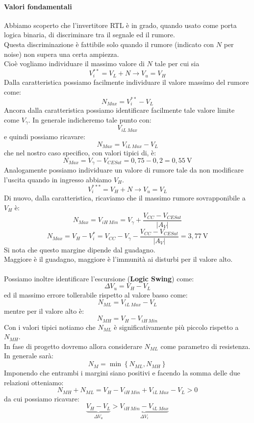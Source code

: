\documentclass[../main.tex]{subfiles}
\begin{document}
	\paragraph{Valori fondamentali}
	Abbiamo scoperto che l’invertitore RTL è in grado, quando usato come porta logica binaria, di discriminare tra il segnale ed il rumore. \\
	Questa discriminazione è fattibile solo quando il rumore (indicato con $N$ per noise) non supera una certa ampiezza. \\
	Cioè vogliamo individuare il massimo valore di $N$ tale per cui sia
	$$V_i^{**} = V_L + N \longrightarrow V_u = V_H$$
	Dalla caratteristica possiamo facilmente individuare il valore massimo del rumore come:
	$$N_{Max} = V_i^{**} - V_L$$
	Ancora dalla caratteristica possiamo identificare facilmente tale valore limite come $V_\gamma$. In generale indicheremo tale punto con:
	$$V_{iL \ Max}$$
	e quindi possiamo ricavare:
	$$N_{Max} = V_{iL \ Max} - V_L$$
	che nel nostro caso specifico, con valori tipici di, è:
	$$N_{Max} = V_\gamma - V_{CESat} = 0,75 - 0,2 = 0,55\ \text{V}$$
	Analogamente possiamo individuare un valore di rumore tale da non modificare l’uscita quando in ingresso abbiamo $V_H$.
	$$V_i^{***} = V_H + N \longrightarrow V_u = V_L$$
	Di nuovo, dalla caratteristica, ricaviamo che il massimo rumore sovrapponibile a $V_H$ è:
	$$N_{Max} = V_{iH \ Min} = V_\gamma + \frac{V_{CC} - V_{CESat}}{|A_V|}$$
	$$N_{Max} = V_H - V_i^* = V_{CC} - V_\gamma - \frac{V_{CC} - V_{CESat}}{|A_V|} = 3,77\ \text{V}$$
	Si nota che questo margine dipende dal guadagno. \\
	Maggiore è il guadagno, maggiore è l’immunità ai disturbi per il valore alto.\\\\
	Possiamo inoltre identificare l’escursione (\textbf{Logic Swing}) come:
	$$\Delta V_u = V_H - V_L$$
	ed il massimo errore tollerabile rispetto al valore basso come:
	$$N_{ML} = V_{iL \ Max} - V_L$$
	mentre per il valore alto è:
	$$N_{MH} = V_H - V_{iH \ Min}$$
	Con i valori tipici notiamo che $N_{ML}$ è significativamente più piccolo rispetto a $N_{MH}$. \\
	In fase di progetto dovremo allora considerare $N_{ML}$ come parametro di resistenza. In generale sarà:
	$$N_M = \min \left\{N_{ML}, N_{MH}\right\}$$
	Imponendo che entrambi i margini siano positivi e facendo la somma delle due relazioni otteniamo:
	$$N_{MH} + N_{ML} = V_H - V_{iH \ Min} + V_{iL \ Max} - V_L > 0$$
	da cui possiamo ricavare:
	$$\underbrace{V_H - V_L}_{\Delta V_u} > \underbrace{V_{iH \ Min} - V_{iL \ Max}}_{\Delta V_i}$$
\end{document}

